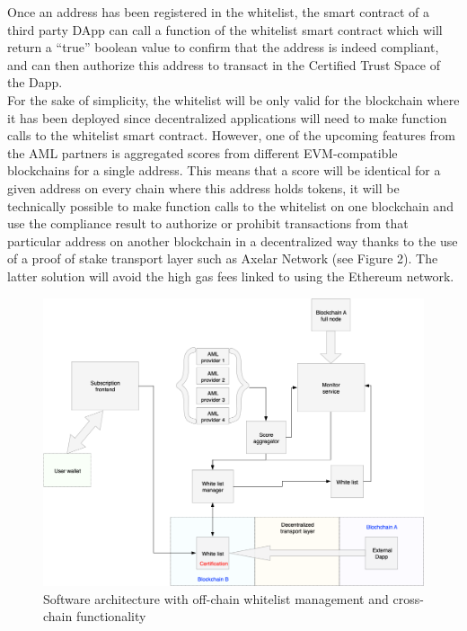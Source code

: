 ﻿\documentclass[a4paper]{article}
\let\OldTexttrademark\texttrademark
\renewcommand{\texttrademark}{\OldTexttrademark\xspace}%
\begin{document}
Once an address has been registered in the whitelist, the smart contract of a third party DApp can call a function of the whitelist smart contract which will return a “true” boolean value to confirm that the address is indeed compliant, and can then authorize this address to transact in the Certified Trust Space\texttrademark of the Dapp. \\

For the sake of simplicity, the whitelist will be only valid for the blockchain where it has been deployed since decentralized applications will need to make function calls to the whitelist smart contract. However, one of the upcoming features from the AML partners is aggregated scores from different EVM-compatible blockchains for a single address. This means that a score will be identical for a given address on every chain where this address holds tokens, it will be technically possible to make function calls to the whitelist on one blockchain and use the compliance result to authorize or prohibit transactions from that particular address on another blockchain in a decentralized way thanks to the use of a proof of stake transport layer such as Axelar Network (see Figure 2). 
The latter solution will avoid the high gas fees linked to using the Ethereum network. \\

\begin{figure}[!h]
\centering
\includegraphics[scale=0.35]{architecture_v1_crosschain_trim.png}
\caption{Software architecture with off-chain whitelist management and cross-chain functionality}
\label{offchain}
\end{figure}  
\end{document}
